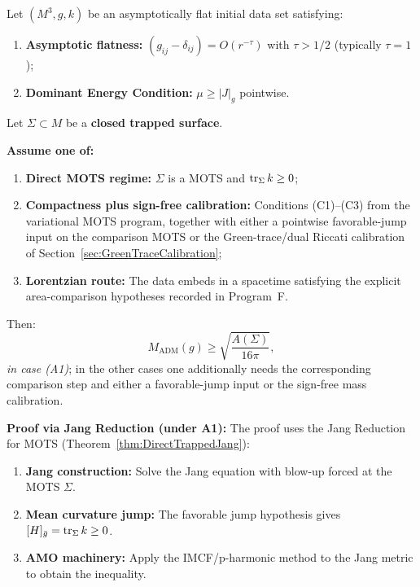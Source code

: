 \begin{theorem}\label{thm:CompleteProof}
Let $(M^3, g, k)$ be an asymptotically flat initial data set satisfying:
\begin{enumerate}[(H1)]
    \item \textbf{Asymptotic flatness:} $(g_{ij} - \delta_{ij}) = O(r^{-\tau})$ with $\tau > 1/2$ (typically $\tau=1$);
    \item \textbf{Dominant Energy Condition:} $\mu \ge |J|_g$ pointwise.
\end{enumerate}
Let $\Sigma \subset M$ be a \textbf{closed trapped surface}. 

\textbf{Assume one of:}
\begin{enumerate}[(A1)]
    \item \textbf{Direct MOTS regime:} $\Sigma$ is a MOTS and $\operatorname{tr}_\Sigma k \ge 0$;
    \item \textbf{Compactness plus sign-free calibration:} Conditions (C1)--(C3) from the variational MOTS program, together with either a pointwise favorable-jump input on the comparison MOTS or the Green-trace/dual Riccati calibration of Section~\ref{sec:GreenTraceCalibration};
    \item \textbf{Lorentzian route:} The data embeds in a spacetime satisfying the explicit area-comparison hypotheses recorded in Program~F.
\end{enumerate}
Then:
\begin{equation}\label{eq:FinalPI}
    M_{\mathrm{ADM}}(g) \ge \sqrt{\frac{A(\Sigma)}{16\pi}},
\end{equation}
\emph{in case (A1)}; in the other cases one additionally needs the corresponding comparison step and either a favorable-jump input or the sign-free mass calibration.

\textbf{Proof via Jang Reduction (under A1):} The proof uses the Jang Reduction for MOTS (Theorem~\ref{thm:DirectTrappedJang}):
\begin{enumerate}
    \item \textbf{Jang construction:} Solve the Jang equation with blow-up forced at the MOTS $\Sigma$.
    \item \textbf{Mean curvature jump:} The favorable jump hypothesis gives $[H]_{\bar{g}} = \operatorname{tr}_\Sigma k \ge 0$.
    \item \textbf{AMO machinery:} Apply the IMCF/p-harmonic method to the Jang metric to obtain the inequality.
\end{enumerate}


\end{theorem}
